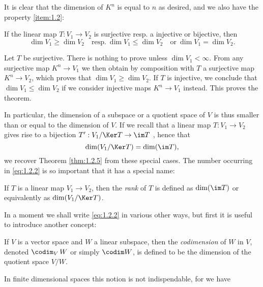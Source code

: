 It is clear that the dimension of $K^n$ is equal to $n$ as desired,
and we also have the property \ref{item:1.2}:
\begin{thm}\label{thm:1.2.5}
  If the linear map $T: V_1\to V_2$ is surjective resp. a injective or
  bijective, then
  \begin{displaymath}
    \dim V_1\geq\dim V_2 \quad\text{resp.}\ \dim V_1\leq\dim V_2
    \quad\text{or}\ \dim V_1=\dim V_2.
  \end{displaymath}
\end{thm}
\begin{prf}
  Let $T$ be surjective. There is nothing to prove unless
   {$\dim V_1<\infty$}. From any surjective map $K^n\to V_1$ we then obtain by
  composition with $T$ a surjective map $K^n\to V_2$, which proves
  that $\dim V_1\geq \dim V_2$. If $T$ is injective, we conclude that
  $\dim V_1\leq \dim V_2$ if we consider injective maps $K^n\to V_1$
  instead. This proves the theorem.
\end{prf}
In particular, the dimension of a subspace or a quotient space of $V$
is thus smaller than or equal to the dimension of $V$. If we recall
that a linear map $T:V_1\to V_2$ gives rise to a bijection
$T':V_1/\Ker T\to \im T$ , hence that
\begin{equation}
  \label{eq:1.2.2}
  \dim (V_1/\Ker T)=\dim(\im T),
\end{equation}
we recover Theorem \ref{thm:1.2.5} from these special cases. The
number occurring in \eqref{eq:1.2.2} is so important that it has a
special name:
\begin{dfn}
  If $T$ is a linear map $V_1\to V_2$, then the \emph{rank} of $T$ is
  defined as $\dim(\im T)$ or equivalently as $\dim(V_1/\Ker T)$.
\end{dfn}
In a moment we shall write \eqref{eq:1.2.2} in various other ways, but
first it is useful to introduce another concept:
\begin{dfn}
  If $V$ is a vector space and $W$ a linear subspace, then the
  \emph{codimension} of $W$ in $V$, denoted $\codim_V\,W$ or
  simply $\codim W$, is defined to be the dimension of the
  quotient space $V/W$.
\end{dfn}
In finite dimensional spaces this notion is not indispendable, for we
have
